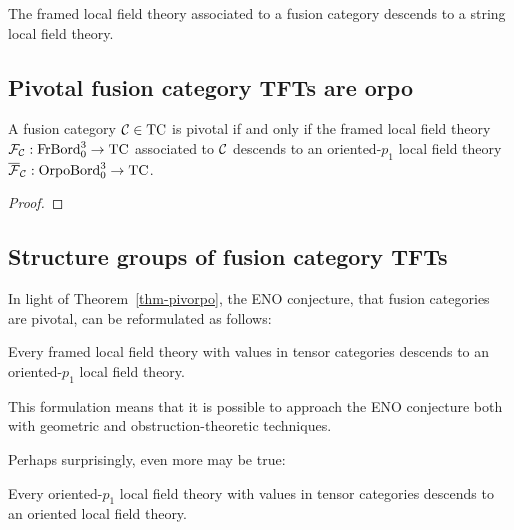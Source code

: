 \documentclass{amsart}
\begin{document}
\begin{corollary}
The framed local field theory associated to a fusion category descends to a string local field theory.
\end{corollary}



\subsection{Pivotal fusion category TFTs are orpo} \label{sec-pivot-orpo}

\begin{theorem} \label{thm-pivorpo}
A fusion category $\mathcal C \in \mathrm{TC}$ is pivotal if and only if the framed local field theory $\mathcal F_{\mathcal C} : \mathrm{FrBord}_0^3 \rightarrow \mathrm{TC}$ associated to $\mathcal C$ descends to an oriented-$p_1$ local field theory $\overline{\mathcal F}_{\mathcal C} : \mathrm{OrpoBord}_0^3 \rightarrow \mathrm{TC}$.
\end{theorem}

\begin{proof}

\end{proof}


\subsection{Structure groups of fusion category TFTs} \label{sec-pivot-struc}


In light of Theorem~\ref{thm-pivorpo}, the ENO conjecture, that fusion categories are pivotal, can be reformulated as follows:
\begin{conjecture}
Every framed local field theory with values in tensor categories descends to an oriented-$p_1$ local field theory.
\end{conjecture}
This formulation means that it is possible to approach the ENO conjecture both with geometric and obstruction-theoretic techniques.

Perhaps surprisingly, even more may be true:
\begin{conjecture}
Every oriented-$p_1$ local field theory with values in tensor categories descends to an oriented local field theory.
\end{conjecture}
\end{document}
